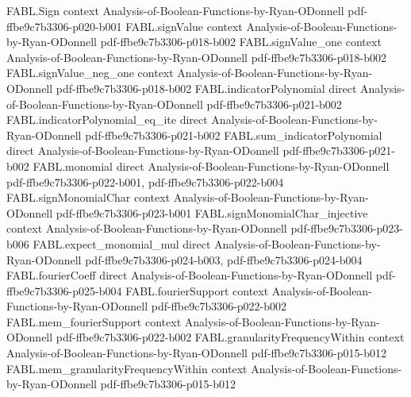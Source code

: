 \begin{theorem}
\label{FABL.stabilityCurve_eq_noiseStability}
\leanok
{}
\proofstep
  {FABL.Sign}
  {context}
  {Analysis-of-Boolean-Functions-by-Ryan-ODonnell}
  {pdf-ffbe9c7b3306-p020-b001}
\proofstep
  {FABL.signValue}
  {context}
  {Analysis-of-Boolean-Functions-by-Ryan-ODonnell}
  {pdf-ffbe9c7b3306-p018-b002}
\proofstep
  {FABL.signValue_one}
  {context}
  {Analysis-of-Boolean-Functions-by-Ryan-ODonnell}
  {pdf-ffbe9c7b3306-p018-b002}
\proofstep
  {FABL.signValue_neg_one}
  {context}
  {Analysis-of-Boolean-Functions-by-Ryan-ODonnell}
  {pdf-ffbe9c7b3306-p018-b002}
\proofstep
  {FABL.indicatorPolynomial}
  {direct}
  {Analysis-of-Boolean-Functions-by-Ryan-ODonnell}
  {pdf-ffbe9c7b3306-p021-b002}
\proofstep
  {FABL.indicatorPolynomial_eq_ite}
  {direct}
  {Analysis-of-Boolean-Functions-by-Ryan-ODonnell}
  {pdf-ffbe9c7b3306-p021-b002}
\proofstep
  {FABL.sum_indicatorPolynomial}
  {direct}
  {Analysis-of-Boolean-Functions-by-Ryan-ODonnell}
  {pdf-ffbe9c7b3306-p021-b002}
\proofstep
  {FABL.monomial}
  {direct}
  {Analysis-of-Boolean-Functions-by-Ryan-ODonnell}
  {pdf-ffbe9c7b3306-p022-b001,
    pdf-ffbe9c7b3306-p022-b004}
\proofstep
  {FABL.signMonomialChar}
  {context}
  {Analysis-of-Boolean-Functions-by-Ryan-ODonnell}
  {pdf-ffbe9c7b3306-p023-b001}
\proofstep
  {FABL.signMonomialChar_injective}
  {context}
  {Analysis-of-Boolean-Functions-by-Ryan-ODonnell}
  {pdf-ffbe9c7b3306-p023-b006}
\proofstep
  {FABL.expect_monomial_mul}
  {direct}
  {Analysis-of-Boolean-Functions-by-Ryan-ODonnell}
  {pdf-ffbe9c7b3306-p024-b003,
    pdf-ffbe9c7b3306-p024-b004}
\proofstep
  {FABL.fourierCoeff}
  {direct}
  {Analysis-of-Boolean-Functions-by-Ryan-ODonnell}
  {pdf-ffbe9c7b3306-p025-b004}
\proofstep
  {FABL.fourierSupport}
  {context}
  {Analysis-of-Boolean-Functions-by-Ryan-ODonnell}
  {pdf-ffbe9c7b3306-p022-b002}
\proofstep
  {FABL.mem_fourierSupport}
  {context}
  {Analysis-of-Boolean-Functions-by-Ryan-ODonnell}
  {pdf-ffbe9c7b3306-p022-b002}
\proofstep
  {FABL.granularityFrequencyWithin}
  {context}
  {Analysis-of-Boolean-Functions-by-Ryan-ODonnell}
  {pdf-ffbe9c7b3306-p015-b012}
\proofstep
  {FABL.mem_granularityFrequencyWithin}
  {context}
  {Analysis-of-Boolean-Functions-by-Ryan-ODonnell}
  {pdf-ffbe9c7b3306-p015-b012}
\proofstep

\end{theorem}
